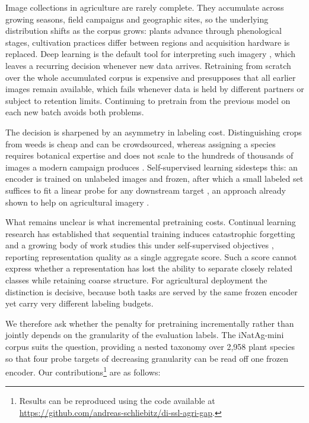 \documentclass[english]{lni}
\begin{document}
Image collections in agriculture are rarely complete. They accumulate across growing seasons, field campaigns and geographic sites, so the underlying distribution shifts as the corpus grows: plants advance through phenological stages, cultivation practices differ between regions and acquisition hardware is replaced. Deep learning is the default tool for interpreting such imagery \cite{Kamilaris2018}, which leaves a recurring decision whenever new data arrives. Retraining from scratch over the whole accumulated corpus is expensive and presupposes that all earlier images remain available, which fails whenever data is held by different partners or subject to retention limits. Continuing to pretrain from the previous model on each new batch avoids both problems.

The decision is sharpened by an asymmetry in labeling cost. Distinguishing crops from weeds is cheap and can be crowdsourced, whereas assigning a species requires botanical expertise and does not scale to the hundreds of thousands of images a modern campaign produces \cite{VanHorn2018,Jain2025}. Self-supervised learning sidesteps this: an encoder is trained on unlabeled images and frozen, after which a small labeled set suffices to fit a linear probe for any downstream target \cite{Chen2020,Caron2021,Oquab2024}, an approach already shown to help on agricultural imagery \cite{Gueldenring2021}.

What remains unclear is what incremental pretraining costs. Continual learning research has established that sequential training induces catastrophic forgetting \cite{French1999,Kirkpatrick2017} and a growing body of work studies this under self-supervised objectives \cite{Fini2022,Purushwalkam2022,Madaan2022}, reporting representation quality as a single aggregate score. Such a score cannot express whether a representation has lost the ability to separate closely related classes while retaining coarse structure. For agricultural deployment the distinction is decisive, because both tasks are served by the same frozen encoder yet carry very different labeling budgets.

We therefore ask whether the penalty for pretraining incrementally rather than jointly depends on the granularity of the evaluation labels. The iNatAg-mini corpus \cite{Jain2025} suits the question, providing a nested taxonomy over 2,958 plant species so that four probe targets of decreasing granularity can be read off one frozen encoder. Our contributions\footnote{Results can be reproduced using the code available at \url{https://github.com/andreas-schliebitz/di-ssl-agri-gap}.} are as follows:
\end{document}
